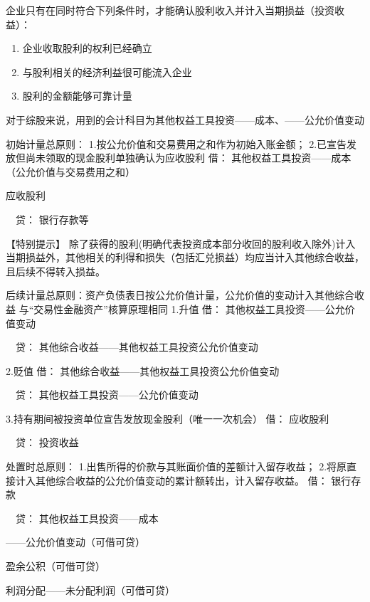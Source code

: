 \documentclass[UTF8,12pt]{ctexart}
\newenvironment{Dr}{\noindent 借：}{\par}
\newenvironment{Cr}{\noindent \ \ 贷：}{\par}
\numberwithin{equation}{section} %
\numberwithin{figure}{section}
\numberwithin{table}{section}
\begin{document}
	企业只有在同时符合下列条件时，才能确认股利收入并计入当期损益（投资收益）：
	\begin{enumerate}
		\item 企业收取股利的权利已经确立
		
		\item 与股利相关的经济利益很可能流入企业
		
		\item 股利的金额能够可靠计量
	\end{enumerate}

	
	对于综股来说，用到的会计科目为其他权益工具投资——成本、——公允价值变动
	
	初始计量总原则：
	1.按公允价值和交易费用之和作为初始入账金额；
	2.已宣告发放但尚未领取的现金股利单独确认为应收股利
	\begin{Dr}
		其他权益工具投资——成本（公允价值与交易费用之和）
		
		应收股利
	\end{Dr}
	\begin{Cr}
		银行存款等
	\end{Cr}

	【特别提示】
	除了获得的股利(明确代表投资成本部分收回的股利收入除外)计入当期损益外，其他相关的利得和损失（包括汇兑损益）均应当计入其他综合收益，且后续不得转入损益。
	
	后续计量总原则：资产负债表日按公允价值计量，公允价值的变动计入其他综合收益
	与“交易性金融资产”核算原理相同
	1.升值
	\begin{Dr}
		其他权益工具投资——公允价值变动
	\end{Dr}
	\begin{Cr}
		其他综合收益——其他权益工具投资公允价值变动
	\end{Cr}

	2.贬值
	\begin{Dr}
		其他综合收益——其他权益工具投资公允价值变动
	\end{Dr}
	\begin{Cr}
		其他权益工具投资——公允价值变动
	\end{Cr}

	3.持有期间被投资单位宣告发放现金股利（唯一一次机会）
	\begin{Dr}
		应收股利
	\end{Dr}
	\begin{Cr}
		投资收益
	\end{Cr}

	
	处置时总原则：
	1.出售所得的价款与其账面价值的差额计入留存收益；
	2.将原直接计入其他综合收益的公允价值变动的累计额转出，计入留存收益。
	\begin{Dr}
		银行存款
	\end{Dr}
	\begin{Cr}
		其他权益工具投资——成本
		
		——公允价值变动（可借可贷）
		
		盈余公积（可借可贷）
		
		利润分配——未分配利润（可借可贷）
	\end{Cr}
\end{document}
